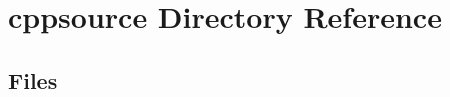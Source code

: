 \section{cppsource Directory Reference}
\label{dir_45a89beb026b53ee419cdacd969c2d17}
\subsection*{Files}
\begin{DoxyCompactItemize}
\end{DoxyCompactItemize}
